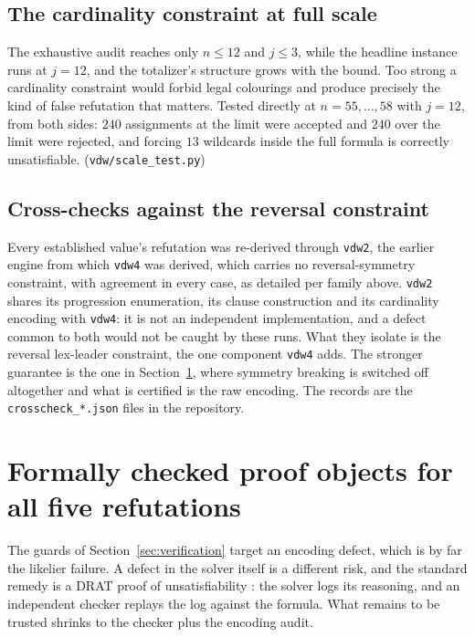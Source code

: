 \documentclass[12pt]{article}
\theoremstyle{remark}
\begin{document}
\subsection{The cardinality constraint at full scale}

The exhaustive audit reaches only $n \le 12$ and $j \le 3$, while the
headline instance runs at $j=12$, and the totalizer's structure grows with
the bound. Too strong a cardinality constraint would forbid legal colourings
and produce precisely the kind of false refutation that matters. Tested
directly at $n=55,\dots,58$ with $j=12$, from both sides: $240$ assignments
at the limit were accepted and $240$ over the limit were rejected, and
forcing $13$ wildcards inside the full formula is correctly unsatisfiable.
(\texttt{vdw/scale\_test.py})

\subsection{Cross-checks against the reversal constraint}

Every established value's refutation was re-derived through \texttt{vdw2},
the earlier engine from which \texttt{vdw4} was derived, which carries no
reversal-symmetry constraint, with agreement in every case, as detailed per
family above. \texttt{vdw2} shares its progression enumeration, its clause
construction and its cardinality encoding with \texttt{vdw4}: it is not an
independent implementation, and a defect common to both would not be caught
by these runs. What they isolate is the reversal lex-leader constraint, the
one component \texttt{vdw4} adds. The stronger guarantee is the one in
Section~\ref{sec:drat}, where symmetry breaking is switched off altogether
and what is certified is the raw encoding. The records are the
\texttt{crosscheck\_*.json} files in the repository.

\section{Formally checked proof objects for all five
refutations}\label{sec:drat}

The guards of Section~\ref{sec:verification} target an encoding defect,
which is by far the likelier failure. A defect in the solver itself is a
different risk, and the standard remedy is a DRAT proof of unsatisfiability
\cite{drattrim}: the solver logs its reasoning, and an independent checker
replays the log against the formula. What remains to be trusted shrinks to
the checker plus the encoding audit.
\end{document}
